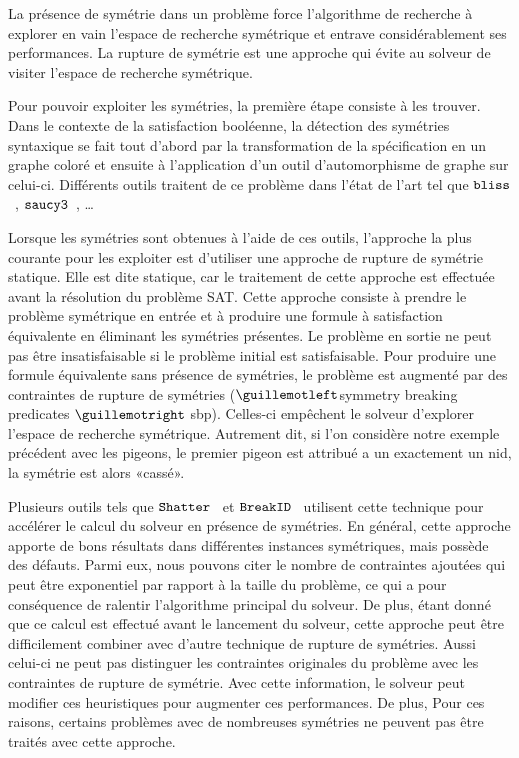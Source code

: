 La présence de symétrie dans un problème force l'algorithme de recherche à explorer en vain l'espace de recherche symétrique et entrave considérablement ses performances. La rupture de symétrie est une approche qui évite au solveur de visiter l'espace de recherche symétrique.

Pour pouvoir exploiter les symétries, la première étape consiste à les trouver. Dans le contexte de la satisfaction booléenne, la détection des symétries syntaxique se fait tout d'abord par la transformation de la spécification en un graphe coloré et ensuite à l'application d'un outil d'automorphisme de graphe sur celui-ci.
Différents outils traitent de ce problème dans l'état de l'art tel que $\texttt{bliss}$~\cite{JunttilaKaski:ALENEX2007}, $\texttt{saucy3}$~\cite{katebi2010symmetry}, …


Lorsque les symétries sont obtenues à l'aide de ces outils, l'approche la plus courante pour les exploiter est d'utiliser une approche de rupture de symétrie statique. Elle est dite statique, car le traitement de cette approche  est effectuée avant la résolution du problème SAT.
Cette approche consiste à prendre le problème symétrique en entrée et à produire une formule à satisfaction équivalente en éliminant les symétries présentes. Le problème en sortie ne peut pas être insatisfaisable si le problème initial est satisfaisable.
Pour produire une formule équivalente sans présence de symétries, le problème est augmenté par des 
contraintes de rupture de  symétries ($\guillemotleft$symmetry breaking predicates $\guillemotright$ sbp). Celles-ci empêchent le solveur d'explorer l'espace de recherche symétrique. 
Autrement dit, si l'on considère notre exemple précédent avec les pigeons, le premier pigeon est attribué a un
exactement un nid, la symétrie est alors «cassé».

Plusieurs outils tels que $\texttt{Shatter}$~\cite{aloul06} et $\texttt{BreakID}$~\cite{devriendt2016improved}  utilisent cette technique pour accélérer le calcul du solveur en présence de symétries.
En général, cette approche apporte de bons résultats dans différentes instances symétriques, mais possède des défauts. Parmi eux, nous pouvons citer le nombre de contraintes ajoutées qui peut être exponentiel par rapport à la taille du problème, ce qui a pour conséquence de ralentir l'algorithme principal du solveur.
De plus, étant donné que ce calcul est effectué avant le lancement du solveur, cette approche peut être difficilement combiner avec d'autre technique de rupture de symétries. Aussi celui-ci ne peut pas distinguer les contraintes originales du problème avec les contraintes de rupture de symétrie. Avec cette information, le solveur peut modifier ces heuristiques pour augmenter ces performances. De plus, 
Pour ces raisons, certains problèmes avec de nombreuses symétries ne peuvent pas être traités avec cette approche.

